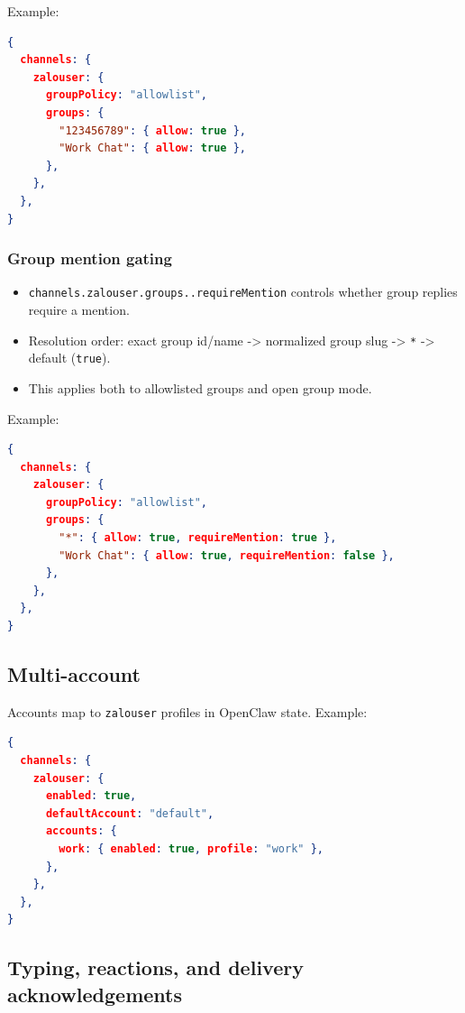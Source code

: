 Example:

\begin{lstlisting}[language=json]
{
  channels: {
    zalouser: {
      groupPolicy: "allowlist",
      groups: {
        "123456789": { allow: true },
        "Work Chat": { allow: true },
      },
    },
  },
}
\end{lstlisting}


\subsubsection{Group mention gating}


\begin{itemize}
  \item \texttt{channels.zalouser.groups..requireMention} controls whether group replies require a mention.
  \item Resolution order: exact group id/name -> normalized group slug -> \texttt{*} -> default (\texttt{true}).
  \item This applies both to allowlisted groups and open group mode.
\end{itemize}


Example:

\begin{lstlisting}[language=json]
{
  channels: {
    zalouser: {
      groupPolicy: "allowlist",
      groups: {
        "*": { allow: true, requireMention: true },
        "Work Chat": { allow: true, requireMention: false },
      },
    },
  },
}
\end{lstlisting}


\subsection{Multi-account}


Accounts map to \texttt{zalouser} profiles in OpenClaw state. Example:

\begin{lstlisting}[language=json]
{
  channels: {
    zalouser: {
      enabled: true,
      defaultAccount: "default",
      accounts: {
        work: { enabled: true, profile: "work" },
      },
    },
  },
}
\end{lstlisting}


\subsection{Typing, reactions, and delivery acknowledgements}


